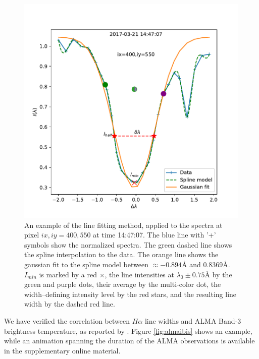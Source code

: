 \documentclass[twocolumn]{aastex62}
\newcommand{\figref}[1]{Figure \ref{#1}}
\newcommand{\halpha}{\ensuremath{H\alpha}}
\newcommand{\linecenter}{\ensuremath{\lambda_0}}
\newcommand{\imin}{\ensuremath{I_\mathit{min}}}
\begin{document}
\begin{figure}
    \centering
    \includegraphics[width=\linewidth]{figures/line-fit-example-figure.pdf}
    \caption{An example of the line fitting method, applied to the spectra at pixel $ix,iy=400,550$ at time 14:47:07.  The blue line with '+' symbols show the normalized spectra.  The green dashed line shows the spline interpolation to the data.  The orange line shows the gaussian fit to the spline model between $\approx-0.894$\AA{} and $0.8369$\AA{}.  \imin{} is marked by a red $\times$, the line intensities at $\linecenter\pm0.75$\AA{} by the green and purple dots, their average by the multi-color dot, the width--defining intensity level by the red stars, and the resulting line width by the dashed red line.}
    \label{fig:linefitexample}
\end{figure}

We have verified the correlation between \halpha{} line widths and ALMA Band-3 brightness temperature, as reported by \citet{2019Molnar}.  \figref{fig:almaibis} shows an example, while an animation spanning the duration of the ALMA observations is available in the supplementary online material.
\end{document}
